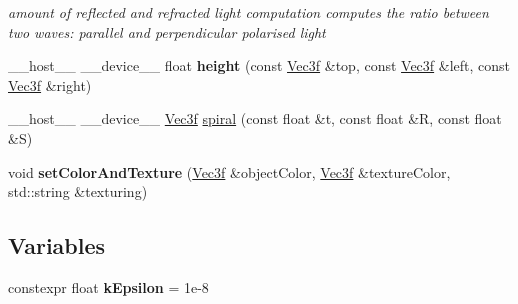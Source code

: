 \begin{DoxyCompactItemize}
\begin{DoxyCompactList}\small\item\em amount of reflected and refracted light computation  computes the ratio between two waves\+: parallel and perpendicular polarised light \end{DoxyCompactList}\item 
\+\_\+\+\_\+host\+\_\+\+\_\+ \+\_\+\+\_\+device\+\_\+\+\_\+ float {\bfseries height} (const \hyperlink{class_vec3}{Vec3f} \&top, const \hyperlink{class_vec3}{Vec3f} \&left, const \hyperlink{class_vec3}{Vec3f} \&right)
\item 
\+\_\+\+\_\+host\+\_\+\+\_\+ \+\_\+\+\_\+device\+\_\+\+\_\+ \hyperlink{class_vec3}{Vec3f} \hyperlink{group__linear__algebra_gac9237c364274b9a0fbb9184fae573357}{spiral} (const float \&t, const float \&R, const float \&S)
\item 
void {\bfseries set\+Color\+And\+Texture} (\hyperlink{class_vec3}{Vec3f} \&object\+Color, \hyperlink{class_vec3}{Vec3f} \&texture\+Color, std\+::string \&texturing)
\end{DoxyCompactItemize}
\subsection*{Variables}
\begin{DoxyCompactItemize}
\item 
constexpr float {\bfseries k\+Epsilon} = 1e-\/8
\end{DoxyCompactItemize}

